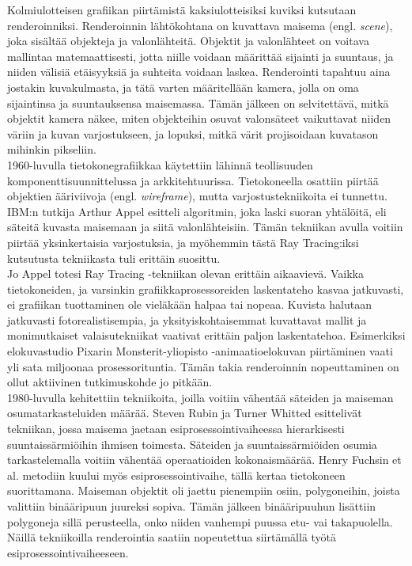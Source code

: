 \documentclass[a4paper,12pt, titlepage]{article}
\theoremstyle{break}
\begin{document}
Kolmiulotteisen grafiikan piirtämistä kaksiulotteisiksi kuviksi kutsutaan renderoinniksi. Renderoinnin lähtökohtana on kuvattava maisema (engl. \emph{scene}), joka sisältää objekteja ja valonlähteitä. Objektit ja valonlähteet on voitava mallintaa matemaattisesti, jotta niille voidaan määrittää sijainti ja suuntaus, ja niiden välisiä etäisyyksiä ja suhteita voidaan laskea. Renderointi tapahtuu aina jostakin kuvakulmasta, ja tätä varten määritellään kamera, jolla on oma sijaintinsa ja suuntauksensa maisemassa. Tämän jälkeen on selvitettävä, mitkä objektit kamera näkee, miten objekteihin osuvat valonsäteet vaikuttavat niiden väriin ja kuvan varjostukseen, ja lopuksi, mitkä värit projisoidaan kuvatason mihinkin pikseliin.\cite{janke}\\

1960-luvulla tietokonegrafiikkaa käytettiin lähinnä teollisuuden komponenttisuunnittelussa ja arkkitehtuurissa. Tietokoneella osattiin piirtää objektien ääriviivoja (engl. \emph{wireframe}), mutta varjostustekniikoita ei tunnettu. IBM:n tutkija Arthur Appel esitteli algoritmin, joka laski suoran yhtälöitä, eli säteitä kuvasta maisemaan ja siitä valonlähteisiin. Tämän tekniikan avulla voitiin piirtää yksinkertaisia varjostuksia, ja myöhemmin tästä Ray Tracing:iksi kutsutusta tekniikasta tuli erittäin suosittu.\cite{appel}\\

Jo Appel totesi Ray Tracing -tekniikan olevan erittäin aikaavievä.\cite{appel} Vaikka tietokoneiden, ja varsinkin grafiikkaprosessoreiden laskentateho kasvaa jatkuvasti, ei grafiikan tuottaminen ole vieläkään halpaa tai nopeaa. Kuvista halutaan jatkuvasti fotorealistisempia, ja yksityiskohtaisemmat kuvattavat mallit ja monimutkaiset valaisutekniikat vaativat erittäin paljon laskentatehoa. Esimerkiksi elokuvastudio Pixarin Monsterit-yliopisto -animaatioelokuvan piirtäminen vaati yli sata miljoonaa prosessorituntia.\cite{monsterit} Tämän takia renderoinnin nopeuttaminen on ollut aktiivinen tutkimuskohde jo pitkään.\\

1980-luvulla kehitettiin tekniikoita, joilla voitiin vähentää säteiden ja maiseman osumatarkasteluiden määrää. Steven Rubin ja Turner Whitted esittelivät tekniikan, jossa maisema jaetaan esiprosessointivaiheessa hierarkisesti suuntaissärmiöihin ihmisen toimesta. Säteiden ja suuntaissärmiöiden osumia tarkastelemalla voitiin vähentää operaatioiden kokonaismäärää.\cite{rubin} Henry Fuchsin et al. metodiin kuului myös esiprosessointivaihe, tällä kertaa tietokoneen suorittamana. Maiseman objektit oli jaettu pienempiin osiin, polygoneihin, joista valittiin binääripuun juureksi sopiva. Tämän jälkeen binääripuuhun lisättiin polygoneja sillä perusteella, onko niiden vanhempi puussa etu- vai takapuolella. Näillä tekniikoilla renderointia saatiin nopeutettua siirtämällä työtä esiprosessointivaiheeseen.\cite{fuchs}  \\
\end{document}

